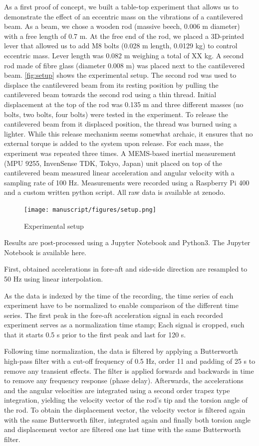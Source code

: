 \documentclass{article}
\begin{document}
As a first proof of concept, we built a table-top experiment that allows us to demonstrate the effect of an eccentric mass on the vibrations of a cantilevered beam. As a beam, we chose a wooden rod (massive beech, 0.006 m diameter) with a free length of 0.7 m. At the free end of the rod, we placed a 3D-printed lever that allowed us to add M8 bolts (0.028 m length, 0.0129 kg) to control eccentric mass. Lever length was 0.082 m weighing a total of XX kg. A second rod made of fibre glass (diameter 0.008 m) was placed next to the cantilevered beam. \autoref{fig:setup} shows the experimental setup. The second rod was used to displace the cantilevered beam from its resting position  by pulling the cantilevered beam towards the second rod using a thin thread. Initial displacement at the top of the rod was 0.135 m and three different masses (no bolts, two bolts, four bolts) were tested in the experiment. To release the cantilevered beam from it displaced position, the thread was burned using a lighter. While this release mechanism seems somewhat archaic, it ensures that no external torque is added to the system upon release. For each mass, the experiment was repeated three times. A MEMS-based inertial measurement (MPU 9255, InvenSense TDK, Tokyo, Japan) unit placed on top of the cantilevered beam measured linear acceleration and angular velocity with a sampling rate of 100 Hz. Measurements were recorded using a Raspberry Pi 400 and a custom written python script. All raw data is available at zenodo. 

\begin{figure}[ht!]
    \centering
    \texttt{[image: manuscript/figures/setup.png]}
    \caption{Experimental setup}
    \label{fig:setup}
\end{figure}

Results are post-processed using a Jupyter Notebook and Python3. The Jupyter Notebook is available here. 

First, obtained accelerations in fore-aft and side-side direction are resampled to 50 Hz using linear interpolation. 

As the data is indexed by the time of the recording, the time series of each experiment have to be normalized to enable comparison of the different time series. The first peak in the fore-aft acceleration signal in each recorded experiment serves as a normalization time stamp; Each signal is cropped, such that it starts 0.5 s prior to the first peak and last for 120 s. 

Following time normalization, the data is filtered by applying a Butterworth high-pass filter with a cut-off frequency of 0.5 Hz, order 11 and padding of 25 s to remove any transient effects. The filter is applied forwards and backwards in time to remove any frequency response (phase delay). Afterwards, the accelerations and the angular velocities are integrated using a second order trapez type integration, yielding the velocity vector of the rod's tip and the torsion angle of the rod. To obtain the displacement vector, the velocity vector is filtered again with the same Butterworth filter, integrated again and finally both torsion angle and displacement vector are filtered one last time with the same Butterworth filter.
\end{document}
